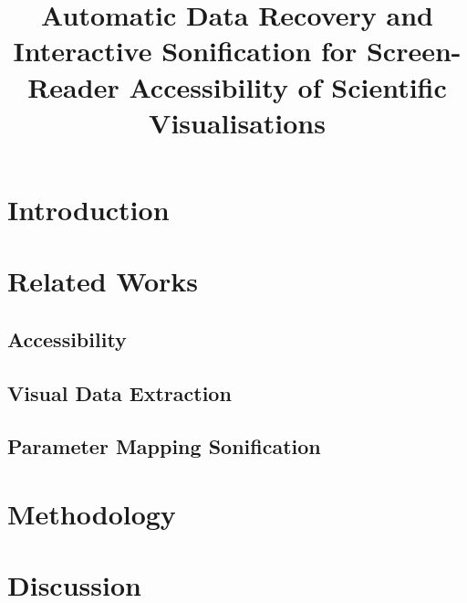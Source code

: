 \documentclass[conference]{IEEEtran}
\begin{document}
\title{Automatic Data Recovery and Interactive Sonification for Screen-Reader Accessibility of Scientific Visualisations}

\author{%
}

\maketitle

\begin{abstract}

\end{abstract}

\begin{IEEEkeywords}

\end{IEEEkeywords}

\section{Introduction}

\section{Related Works}
\subsection{Accessibility}
\subsection{Visual Data Extraction}
\subsection{Parameter Mapping Sonification}

\section{Methodology}

\section{Discussion}


\end{document}
